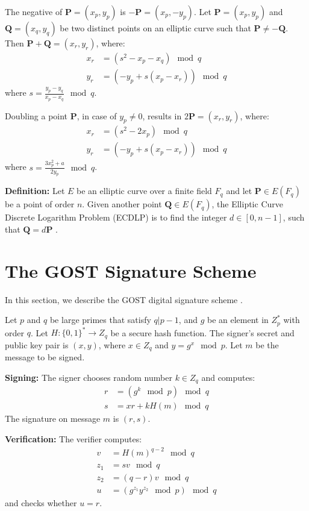 \documentclass[journal,onecolumn,draftcls]{IEEEtran}
\begin{document}
The negative of $\textbf{P}=(x_p,y_p)$ is $-\textbf{P}=(x_p, -y_p)$. Let $\textbf{P}=(x_p,y_p)$ and $\textbf{Q}=(x_q,y_q)$ be two distinct points on an elliptic curve such that $\textbf{P}\not =-\textbf{Q}$. Then $\textbf{P}+\textbf{Q}=(x_r,y_r)$, where:
\begin{align}
x_r &=(s^2-x_p-x_q )  \mod q   \nonumber \\
y_r &= (-y_p+s(x_p-x_r ))  \mod q
\end{align}
where $s=\frac{y_p-y_q}{x_p-x_q} \mod q$. 

Doubling a point $\textbf{P}$, in case of $y_p\not =0$, results in $2\textbf{P}=(x_r,y_r)$, where:
\begin{align}
x_r &=(s^2-2x_p )  \mod q \nonumber \\
y_r &= (-y_p+s(x_p-x_r ))  \mod q
\end{align}
where $s= \frac{3x_p^2+a}{2y_p}  \mod q$.

\textbf{Definition:} Let $E$ be an elliptic curve over a finite field $F_q$ and let $\textbf{P}\in E(F_q)$ be a point of order $n$. Given another point $\textbf{Q}\in E(F_q)$, the Elliptic Curve Discrete Logarithm Problem (ECDLP) is to find the integer $d\in [0,n-1]$, such that $\textbf{Q}=d\textbf{P}$ \cite{Hankerson}.


\section{The GOST Signature Scheme}
In this section, we describe the GOST digital signature scheme \cite{Michels}.

Let $p$ and $q$ be large primes that satisfy $q|p-1$, and $g$ be an element in $Z_p^*$ with order $q$. Let $H:\{0,1\}^*\rightarrow Z_q$ be a secure hash function. The signer's secret and public key pair is $(x,y)$, where $x\in Z_q$ and $y=g^x \mod p$. Let $m$ be the message to be signed.

\textbf{Signing:} The signer chooses random number $k\in Z_q$ and computes:
\begin{align}
r &= (g^k  \mod p)  \mod q \nonumber \\
s &= xr+kH(m)  \mod q
\end{align}
The signature on message $m$ is $(r,s)$.

\textbf{Verification:} The verifier computes:
\begin{align}
v   &=H(m)^{q-2} \mod q \nonumber \\
z_1 &=sv \mod q 			\nonumber \\
z_2 &=(q-r)v \mod q		\nonumber \\
u   &=\left(g^{z_1} y^{z_2}  \mod p\right)  \mod q
\end{align}
and checks whether $u=r$.
\end{document}
